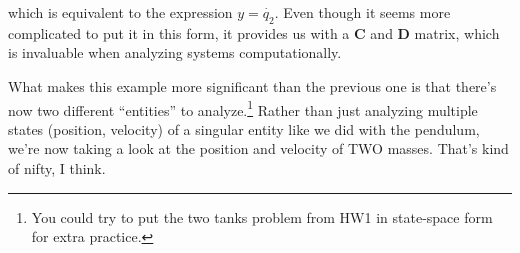 \documentclass{report}
\begin{document}
\begin{onehalfspacing}
\begin{flushleft}
which is equivalent to the expression \(y = \dot{q_2}\). Even though it seems more complicated to put it in this form, it provides us with a \textbf{C} and \textbf{D} matrix, which is invaluable when analyzing systems computationally.

\medskip

What makes this example more significant than the previous one is that there's now two different ``entities'' to analyze.\footnote{You could try to put the two tanks problem from HW1 in state-space form for extra practice.} Rather than just analyzing multiple states (position, velocity) of a singular entity like we did with the pendulum, we're now taking a look at the position and velocity of TWO masses. That's kind of nifty, I think.

\end{flushleft}
\end{onehalfspacing}
\end{document}
